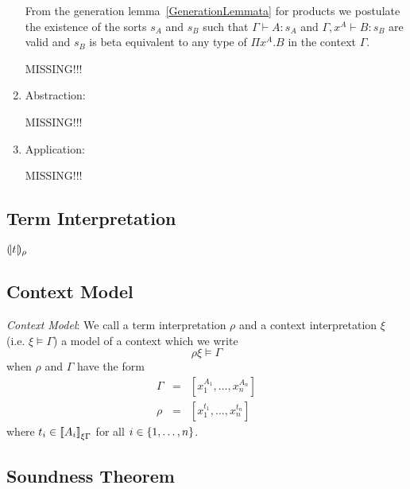 \begin{definition}
\begin{enumerate}
            From the generation lemma~\ref{GenerationLemmata} for products we
            postulate the existence of the sorts $s_A$ and $s_B$ such that
            $\Gamma\vdash A: s_A$ and $\Gamma,x^A\vdash B: s_B$ are valid and
            $s_B$ is beta equivalent to any type of $\Pi x^A.B$ in the context
            $\Gamma$.


            MISSING!!!

    \item Abstraction:

            MISSING!!!

    \item Application:

            MISSING!!!
    \end{enumerate}
\end{definition}



\subsection{Term Interpretation}

${(\!|t|\!)_{\rho}}$



\subsection{Context Model}

\begin{definition}
    \label{DefinitionContextModel}
    \emph{Context Model}: We call a term interpretation $\rho$ and a context
    interpretation $\xi$ (i.e. $\xi \vDash \Gamma$) a model of a context which
    we write
    $$
        \rho\xi \vDash \Gamma
    $$
    when
    $\rho$ and $\Gamma$ have the form
    $$
    \begin{array}{lll}
        \Gamma &=& [x_1^{A_1}, \ldots, x_n^{A_n}]
        \\
        \rho   &=& [x_1^{t_1}, \ldots, x_n^{t_n}]
    \end{array}
    $$
    where $t_i \in {{[\![}A_i{]\!]}}_{\xi\Gamma}$ for all $i \in {\{1,\ldots,n\}}$.
\end{definition}




\subsection{Soundness Theorem}


